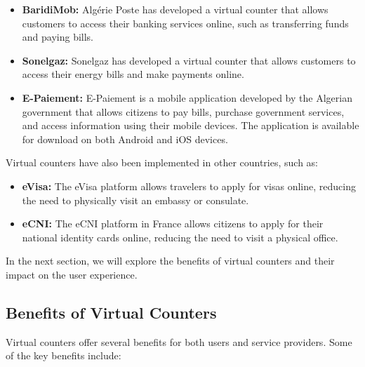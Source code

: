 \begin{itemize}
  \item \textbf{BaridiMob:} Algérie Poste has developed a virtual counter that allows customers to access their banking services online, such as transferring funds and paying bills.
  \item \textbf{Sonelgaz:} Sonelgaz has developed a virtual counter that allows customers to access their energy bills and make payments online.
  \item \textbf{E-Paiement:} E-Paiement is a mobile application developed by the Algerian government that allows citizens to pay bills, purchase government services, and access information using their mobile devices. The application is available for download on both Android and iOS devices.
\end{itemize}

Virtual counters have also been implemented in other countries, such as:

\begin{itemize}
  \item \textbf{eVisa:} The eVisa platform allows travelers to apply for visas online, reducing the need to physically visit an embassy or consulate.
  \item \textbf{eCNI:} The eCNI platform in France allows citizens to apply for their national identity cards online, reducing the need to visit a physical office.
\end{itemize}

In the next section, we will explore the benefits of virtual counters and their impact on the user experience.

\subsection{Benefits of Virtual Counters}
Virtual counters offer several benefits for both users and service providers. Some of the key benefits include:

